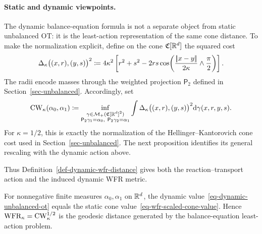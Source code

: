 \paragraph{Static and dynamic viewpoints.}
The dynamic balance-equation formula is not a separate object from static unbalanced OT: it is the least-action representation of the same cone distance. To make the normalization explicit, define on the cone $\mathfrak C[\mathbb{R}^d]$ the squared cost
\begin{equation}\label{eq-wfr-scaled-cone-metric}
	\Delta_\kappa\big((x,r),(y,s)\big)^2
	\coloneqq
	4\kappa^2
	\left[
		r^2+s^2-2rs
		\cos\!\left(
			\frac{|\!| x-y |\!|}{2\kappa}\wedge\frac{\pi}{2}
		\right)
	\right].
\end{equation}
The radii encode masses through the weighted projection $\mathsf P_2$ defined in Section~\ref{sec-unbalanced}. Accordingly, set
\begin{equation}\label{eq-wfr-scaled-cone-value}
	\operatorname{CW}_\kappa(\alpha_0,\alpha_1)
	\coloneqq
	\inf_{\substack{\gamma\in\mathcal{M}_+(\mathfrak C[\mathbb{R}^d]^2)\\
	\mathsf P_2\gamma_1=\alpha_0,\ \mathsf P_2\gamma_2=\alpha_1}}
	\int
	\Delta_\kappa\big((x,r),(y,s)\big)^2
	\mathrm{d}\gamma(x,r,y,s).
\end{equation}
For $\kappa=1/2$, this is exactly the normalization of the Hellinger--Kantorovich cone cost used in Section~\ref{sec-unbalanced}. The next proposition identifies its general rescaling with the dynamic action above.

Thus Definition~\ref{def-dynamic-wfr-distance} gives both the reaction--transport action and the induced dynamic WFR metric.

\begin{prop}\label{prop-static-dynamic-unbalanced}
	For nonnegative finite measures $\alpha_0,\alpha_1$ on $\mathbb{R}^d$, the dynamic value~\eqref{eq-dynamic-unbalanced-ot} equals the static cone value~\eqref{eq-wfr-scaled-cone-value}. Hence $\operatorname{WFR}_\kappa=\operatorname{CW}_\kappa^{1/2}$ is the geodesic distance generated by the balance-equation least-action problem.
\end{prop}

